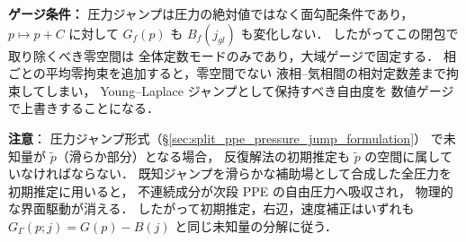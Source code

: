 \noindent\textbf{ゲージ条件：}
圧力ジャンプは圧力の絶対値ではなく面勾配条件であり，
$p\mapsto p+C$ に対して $G_f(p)$ も $B_f(j_{gl})$ も変化しない．
したがってこの閉包で取り除くべき零空間は
全体定数モードのみであり，大域ゲージで固定する．
相ごとの平均零拘束を追加すると，零空間でない
液相--気相間の相対定数差まで拘束してしまい，
Young--Laplace ジャンプとして保持すべき自由度を
数値ゲージで上書きすることになる．

\noindent\textbf{注意}：
圧力ジャンプ形式（\S\ref{sec:split_ppe_pressure_jump_formulation}）
で未知量が $\tilde p$（滑らか部分）となる場合，
反復解法の初期推定も $\tilde p$ の空間に属していなければならない．
既知ジャンプを滑らかな補助場として合成した全圧力を初期推定に用いると，
不連続成分が次段 PPE の自由圧力へ吸収され，
物理的な界面駆動が消える．
したがって初期推定，右辺，速度補正はいずれも
$G_\Gamma(p;j)=G(p)-B(j)$ と同じ未知量の分解に従う．

